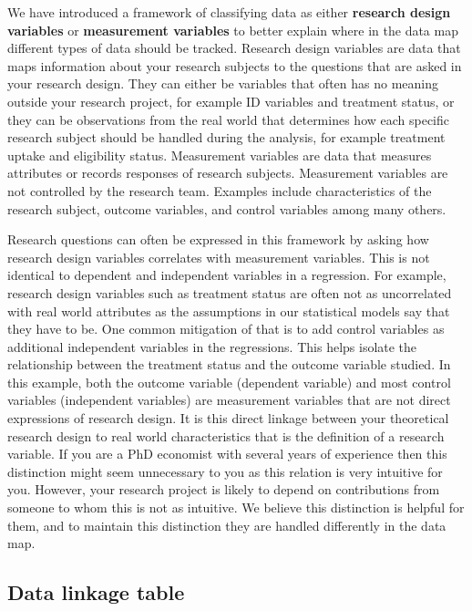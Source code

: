 We have introduced a framework of classifying data
as either \textbf{research design variables} 
or \textbf{measurement variables}
to better explain where in the data map different types of data should be tracked.
Research design variables are data that maps information about your research subjects to the
questions that are asked in your research design.
They can either be variables that often has no meaning outside your research project,
for example ID variables and treatment status,
or they can be observations from the real world 
that determines how each specific research subject 
should be handled during the analysis, 
for example treatment uptake and eligibility status.
Measurement variables are data that
measures attributes or records responses of research subjects.
Measurement variables are not controlled by the research team.
Examples include characteristics of the research subject,
outcome variables, and control variables among many others.

Research questions can often be expressed in this framework 
by asking how research design variables correlates with measurement variables.
This is not identical to dependent and independent variables in a regression.
For example, research design variables such as treatment status are often not 
as uncorrelated with real world attributes 
as the assumptions in our statistical models say that they have to be. 
One common mitigation of that is to add control variables 
as additional independent variables in the regressions.
This helps isolate the relationship between the treatment status and the outcome variable studied. 
In this example, both the outcome variable (dependent variable) and 
most control variables (independent variables) 
are measurement variables that are not direct expressions of research design.
It is this direct linkage between your theoretical research design 
to real world characteristics that is the definition of a research variable.
If you are a PhD economist with several years of experience 
then this distinction might seem unnecessary to you 
as this relation is very intuitive for you. 
However, your research project is likely to depend on contributions 
from someone to whom this is not as intuitive.
We believe this distinction is helpful for them, 
and to maintain this distinction they are handled differently in the data map.


\subsection{Data linkage table}


